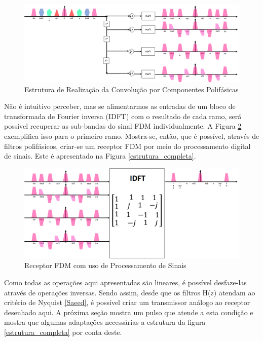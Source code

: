 \begin{figure}[h!]
\centering
\includegraphics[width = 5.5in]{poli_filt_1.png} %
\caption{Estrutura de Realização da Convolução por Componentes Polifásicas}
\label{efeitos}
\end{figure}

\par Não é intuitivo perceber, mas se alimentarmos as entradas de um bloco de transformada de Fourier inversa (IDFT) com o resultado de cada ramo, será possível recuperar as sub-bandas do sinal FDM individualmente. A Figura \ref{rec_poli} exemplifica isso para o primeiro ramo. Mostra-se, então, que é possível, através de filtros polifásicos, criar-se um receptor FDM por meio do processamento digital de sinais. Este é apresentado na Figura \ref{estrutura_completa}. 

\begin{figure}[h!]
\centering
\includegraphics[width = 4.5in]{efeito.png} %
\caption{Receptor FDM com uso de Processamento de Sinais \cite{Krishna}}
\label{rec_poli}
\end{figure}

\par Como todas as operações aqui apresentadas são lineares, é possível desfaze-las através de operações inversas. Sendo assim, desde que os filtros H(z) atendam ao critério de Nyquist \ref{Saeed}, é possível criar um transmissor análogo ao receptor desenhado aqui. A próxima seção mostra um pulso que atende a esta condição e mostra que algumas adaptações necessárias a estrutura da figura \ref{estrutura_completa} por conta deste.  


